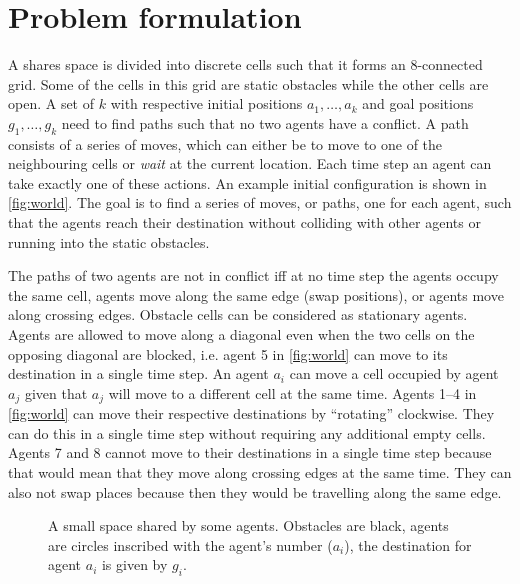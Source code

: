 \section{Problem formulation}\label{sec:problem}
A shares space is divided into discrete cells such that it forms an 8-connected
grid. Some of the cells in this grid are static obstacles while the other cells
are open. A set of $k$ with respective initial positions $a_1, \ldots, a_k$ and
goal positions $g_1, \ldots, g_k$ need to find paths such that no two agents
have a conflict. A path consists of a series of moves, which can either be to
move to one of the neighbouring cells or \emph{wait} at the current location.
Each time step an agent can take exactly one of these actions.
An example initial configuration is shown in \autoref{fig:world}. The goal is
to find a series of moves, or paths, one for each agent, such that the agents
reach their destination without colliding with other agents or running into the
static obstacles.

The paths of two agents are not in conflict iff at no time step the agents
occupy the same cell, agents move along the same edge (swap positions), or
agents move along
crossing edges. Obstacle cells can be considered as stationary agents. Agents
are allowed to move along a diagonal even when the two cells on the opposing
diagonal are blocked, i.e. agent 5 in \autoref{fig:world} can move to its
destination in a single time step. An agent $a_i$ can move a cell occupied by
agent $a_j$ given that $a_j$ will move to a different cell at the same time.
Agents 1--4 in \autoref{fig:world} can move their respective destinations
by ``rotating'' clockwise. They can do this in a single time step without
requiring any additional empty cells. Agents 7 and 8 cannot move to their
destinations in a single time step because that would mean that they move along
crossing edges at the same time. They can also not swap places because then
they would be travelling along the same edge.

\begin{figure}[h]
    \centering
    \def\svgscale{.7}
    
    \caption{A small space shared by some agents. Obstacles are black, agents
        are circles inscribed with the agent's number ($a_i$), the destination
        for
        agent $a_i$ is given by $g_i$.}
    \label{fig:world}
\end{figure}
